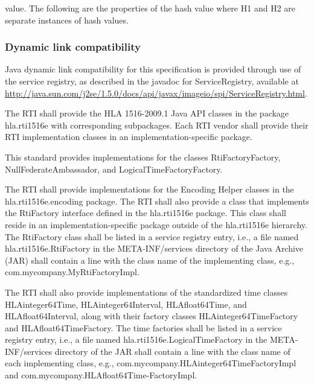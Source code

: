 \begin{compactstdpage}
    value. The following are the properties of the hash value where H1 and H2 are separate instances of hash values.


    \subsubsection{Dynamic link compatibility}

    Java dynamic link compatibility for this specification is provided through use of the service registry, as described in the javadoc for ServiceRegistry, available at \url{http://java.sun.com/j2se/1.5.0/docs/api/javax/imageio/spi/ServiceRegistry.html}.

    The RTI shall provide the HLA 1516-2009.1 Java API classes in the package hla.rti1516e with corresponding subpackages. Each RTI vendor shall provide their RTI implementation classes in an implementation-specific package.

    This standard provides implementations for the classes RtiFactoryFactory, NullFederateAmbassador, and LogicalTimeFactoryFactory.

    The RTI shall provide implementations for the Encoding Helper classes in the hla.rti1516e.encoding package. The RTI shall also provide a class that implements the RtiFactory interface defined in the hla.rti1516e package. This class shall reside in an implementation-specific package outside of the hla.rti1516e hierarchy. The RtiFactory class shall be listed in a service registry entry, i.e., a file named hla.rti1516e.RtiFactory in the META-INF/services directory of the Java Archive (JAR) shall contain a line with the class name of the implementing class, e.g., com.mycompany.MyRtiFactoryImpl.

    {\sloppy The RTI shall also provide implementations of the standardized time classes HLAinteger64Time,\allowbreak{} HLAinteger64Interval,\allowbreak{} HLAfloat64Time,\allowbreak{} and HLAfloat64Interval,\allowbreak{} along with their factory classes HLAinteger64TimeFactory and HLAfloat64TimeFactory. The time factories shall be listed in a service registry entry, i.e., a file named hla.rti1516e.LogicalTimeFactory in the META-INF/services directory of the JAR shall contain a line with the class name of each implementing class, e.g., com.mycompany.HLAinteger64TimeFactoryImpl\allowbreak{} and com.mycompany.HLAfloat64Time-FactoryImpl.\par}


\end{compactstdpage}

